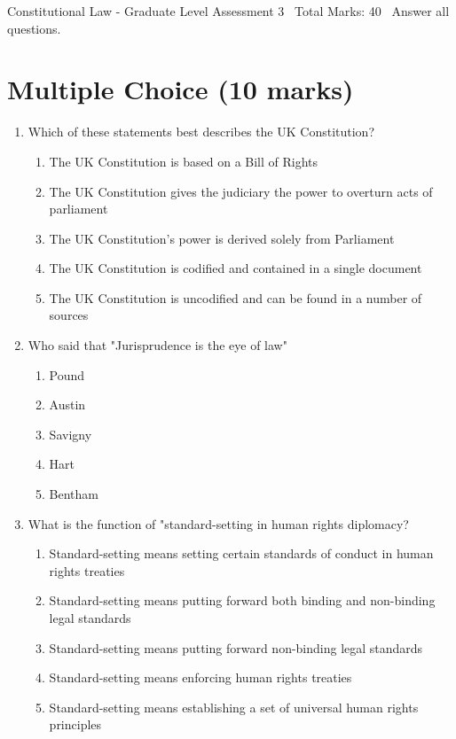 \documentclass[12pt]{article}
\begin{document}
\begin{center}
Constitutional Law - Graduate Level Assessment 3 \
Total Marks: 40 \
Answer all questions.
\end{center}

\section*{Multiple Choice (10 marks)}
\begin{enumerate}[label=\arabic*.]
\item Which of these statements best describes the UK Constitution?
\begin{enumerate}[label=(\alph*)]
    \item The UK Constitution is based on a Bill of Rights
    \item The UK Constitution gives the judiciary the power to overturn acts of parliament
    \item The UK Constitution's power is derived solely from Parliament
    \item The UK Constitution is codified and contained in a single document
    \item The UK Constitution is uncodified and can be found in a number of sources
\end{enumerate}
\item Who said that "Jurisprudence is the eye of law"
\begin{enumerate}[label=(\alph*)]
    \item Pound
    \item Austin
    \item Savigny
    \item Hart
    \item Bentham
\end{enumerate}
\item What is the function of "standard-setting in human rights diplomacy?
\begin{enumerate}[label=(\alph*)]
    \item Standard-setting means setting certain standards of conduct in human rights treaties
    \item Standard-setting means putting forward both binding and non-binding legal standards
    \item Standard-setting means putting forward non-binding legal standards
    \item Standard-setting means enforcing human rights treaties
    \item Standard-setting means establishing a set of universal human rights principles

\end{enumerate}
\end{enumerate}
\end{document}
